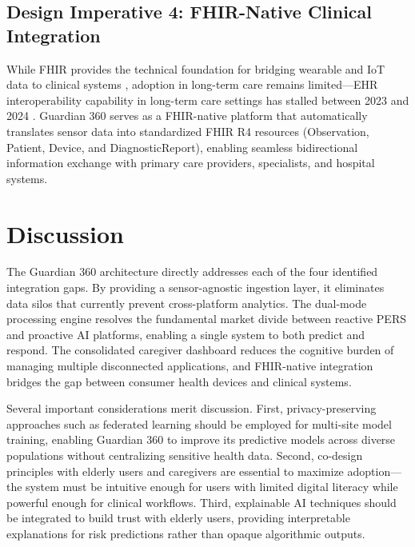 \documentclass[conference]{IEEEtran}
\begin{document}
\subsection{Design Imperative 4: FHIR-Native Clinical Integration}

While FHIR provides the technical foundation for bridging wearable and IoT data to clinical systems \cite{pmc_fhir}, adoption in long-term care remains limited---EHR interoperability capability in long-term care settings has stalled between 2023 and 2024 \cite{mcknights_ehr}. Guardian 360 serves as a FHIR-native platform that automatically translates sensor data into standardized FHIR R4 resources (Observation, Patient, Device, and DiagnosticReport), enabling seamless bidirectional information exchange with primary care providers, specialists, and hospital systems.

\section{Discussion}

The Guardian 360 architecture directly addresses each of the four identified integration gaps. By providing a sensor-agnostic ingestion layer, it eliminates data silos that currently prevent cross-platform analytics. The dual-mode processing engine resolves the fundamental market divide between reactive PERS and proactive AI platforms, enabling a single system to both predict and respond. The consolidated caregiver dashboard reduces the cognitive burden of managing multiple disconnected applications, and FHIR-native integration bridges the gap between consumer health devices and clinical systems.

Several important considerations merit discussion. First, privacy-preserving approaches such as federated learning should be employed for multi-site model training, enabling Guardian 360 to improve its predictive models across diverse populations without centralizing sensitive health data. Second, co-design principles with elderly users and caregivers are essential to maximize adoption---the system must be intuitive enough for users with limited digital literacy while powerful enough for clinical workflows. Third, explainable AI techniques should be integrated to build trust with elderly users, providing interpretable explanations for risk predictions rather than opaque algorithmic outputs.
\end{document}
